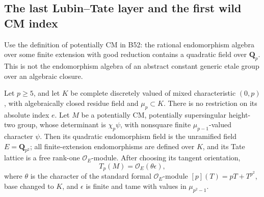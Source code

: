 \subsection{The last Lubin--Tate layer and the first wild CM index}

Use the definition of potentially CM in B52: the rational
endomorphism algebra over some finite extension with good
reduction contains a quadratic field over \(\mathbf Q_p\).
This is not the endomorphism algebra of an abstract constant
generic etale group over an algebraic closure.

\begin{lemma}
\label{lem:B-RD78-model}
Let \(p\ge5\), and let \(K\) be complete discretely valued
of mixed characteristic \((0,p)\), with algebraically closed
residue field and \(\mu_p\subset K\). There is no restriction
on its absolute index \(e\). Let \(M\) be a potentially CM,
potentially supersingular height-two group, whose determinant
is \(\chi_p\psi\), with nonsquare finite
\(\mu_{p-1}\)-valued character \(\psi\).
Then its quadratic endomorphism field is the unramified field
\(E=\mathbf Q_{p^2}\); all finite-extension endomorphisms are
defined over \(K\), and its Tate lattice is a free rank-one
\(\mathcal O_E\)-module. After choosing its tangent orientation,
\[
        T_p(M)=\mathcal O_E(\theta\epsilon),          \tag{B-RD78.1}
\]
where \(\theta\) is the character of the standard formal
\(\mathcal O_E\)-module \([p](T)=pT+T^{p^2}\), base changed
to \(K\), and \(\epsilon\) is finite and tame with values
in \(\mu_{p^2-1}\).
\end{lemma}
